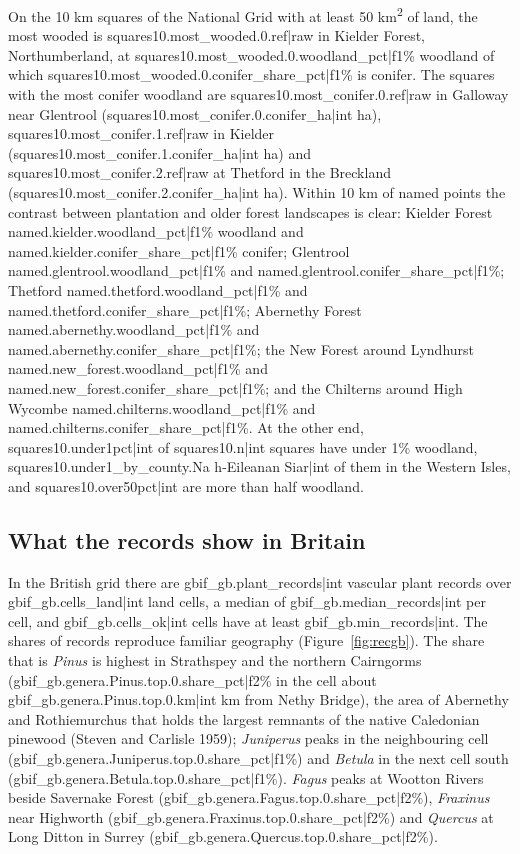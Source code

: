 \documentclass[11pt,a4paper]{article}
\begin{document}
On the 10 km squares of the National Grid with at least 50 km\textsuperscript{2} of land, the most wooded is {{squares10.most_wooded.0.ref|raw}} in Kielder Forest, Northumberland, at {{squares10.most_wooded.0.woodland_pct|f1}}\% woodland of which {{squares10.most_wooded.0.conifer_share_pct|f1}}\% is conifer. The squares with the most conifer woodland are {{squares10.most_conifer.0.ref|raw}} in Galloway near Glentrool ({{squares10.most_conifer.0.conifer_ha|int}} ha), {{squares10.most_conifer.1.ref|raw}} in Kielder ({{squares10.most_conifer.1.conifer_ha|int}} ha) and {{squares10.most_conifer.2.ref|raw}} at Thetford in the Breckland ({{squares10.most_conifer.2.conifer_ha|int}} ha). Within 10 km of named points the contrast between plantation and older forest landscapes is clear: Kielder Forest {{named.kielder.woodland_pct|f1}}\% woodland and {{named.kielder.conifer_share_pct|f1}}\% conifer; Glentrool {{named.glentrool.woodland_pct|f1}}\% and {{named.glentrool.conifer_share_pct|f1}}\%; Thetford {{named.thetford.woodland_pct|f1}}\% and {{named.thetford.conifer_share_pct|f1}}\%; Abernethy Forest {{named.abernethy.woodland_pct|f1}}\% and {{named.abernethy.conifer_share_pct|f1}}\%; the New Forest around Lyndhurst {{named.new_forest.woodland_pct|f1}}\% and {{named.new_forest.conifer_share_pct|f1}}\%; and the Chilterns around High Wycombe {{named.chilterns.woodland_pct|f1}}\% and {{named.chilterns.conifer_share_pct|f1}}\%. At the other end, {{squares10.under1pct|int}} of {{squares10.n|int}} squares have under 1\% woodland, {{squares10.under1_by_county.Na h-Eileanan Siar|int}} of them in the Western Isles, and {{squares10.over50pct|int}} are more than half woodland.

\subsection{What the records show in Britain}

In the British grid there are {{gbif_gb.plant_records|int}} vascular plant records over {{gbif_gb.cells_land|int}} land cells, a median of {{gbif_gb.median_records|int}} per cell, and {{gbif_gb.cells_ok|int}} cells have at least {{gbif_gb.min_records|int}}. The shares of records reproduce familiar geography (Figure~\ref{fig:recgb}). The share that is \textit{Pinus} is highest in Strathspey and the northern Cairngorms ({{gbif_gb.genera.Pinus.top.0.share_pct|f2}}\% in the cell about {{gbif_gb.genera.Pinus.top.0.km|int}} km from Nethy Bridge), the area of Abernethy and Rothiemurchus that holds the largest remnants of the native Caledonian pinewood (Steven and Carlisle 1959); \textit{Juniperus} peaks in the neighbouring cell ({{gbif_gb.genera.Juniperus.top.0.share_pct|f1}}\%) and \textit{Betula} in the next cell south ({{gbif_gb.genera.Betula.top.0.share_pct|f1}}\%). \textit{Fagus} peaks at Wootton Rivers beside Savernake Forest ({{gbif_gb.genera.Fagus.top.0.share_pct|f2}}\%), \textit{Fraxinus} near Highworth ({{gbif_gb.genera.Fraxinus.top.0.share_pct|f2}}\%) and \textit{Quercus} at Long Ditton in Surrey ({{gbif_gb.genera.Quercus.top.0.share_pct|f2}}\%).
\end{document}
